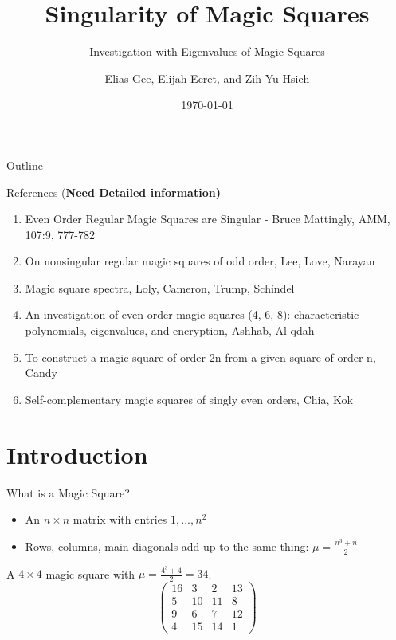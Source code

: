 \documentclass[10pt]{beamer}
\title{Singularity of Magic Squares}
\subtitle{Investigation with Eigenvalues of Magic Squares}
\author{Elias Gee, Elijah Ecret, and Zih-Yu Hsieh}
\institute{UCSB, CCS Mathematics}
\date{\today}
\begin{document}
\maketitle

\begin{frame}{Outline}
    \tableofcontents
\end{frame}

\begin{frame}{References (\textbf{Need Detailed information)}}
\begin{enumerate}
    \item Even Order Regular Magic Squares are Singular - Bruce Mattingly, AMM, 107:9, 777-782
    \item On nonsingular regular magic squares of odd order, Lee, Love, Narayan
    \item Magic square spectra, Loly, Cameron, Trump, Schindel
    \item An investigation of even order magic squares (4, 6, 8): characteristic polynomials, eigenvalues, and encryption, Ashhab, Al-qdah
    \item To construct a magic square of order 2n from a given square of order n, Candy
    \item Self-complementary magic squares of singly even orders, Chia, Kok
\end{enumerate}
\end{frame}

\section{Introduction}

\begin{frame}{What is a Magic Square?}
    \begin{itemize}
      \item An $n\times n$ matrix with entries $1,...,n^2$
      \item Rows, columns, main diagonals add up to the same thing: $\mu=\frac{n^3+n}{2}$
    \end{itemize}
  
    \hfil
  
    \begin{example}A $4\times 4$ magic square with $\mu=\frac{4^3+4}{2}=34$.
    \[\begin{pmatrix}
      16&3&2&13\\
      5&10&11&8\\
      9&6&7&12\\
      4&15&14&1
    \end{pmatrix}\]
    \end{example}
  \end{frame}
  
\end{document}
